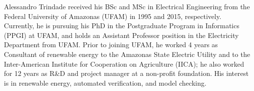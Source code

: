 \documentclass[journal]{IEEEtran}
\begin{document}
\begin{IEEEbiography}
    {Alessandro Trindade}
received his BSc and MSc in Electrical Engineering from the Federal University of Amazonas (UFAM) in 1995 and 2015, respectively. Currently, he is pursuing his PhD in the Postgraduate Program in Informatics (PPGI) at UFAM, and holds an Assistant Professor position in the Electricity Department from UFAM. Prior to joining UFAM, he worked 4 years as Consultant of renewable energy to the Amazonas State Electric Utility and to the Inter-American Institute for Cooperation on Agriculture (IICA); he also worked for 12 years as R\&D and project manager at a non-profit foundation. His interest is in renewable energy, automated verification, and model checking.
\end{IEEEbiography}
%
%
\end{document}
